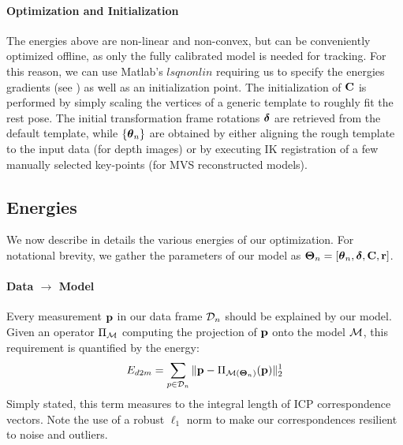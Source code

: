 \paragraph{Optimization and Initialization}
The energies above are non-linear and non-convex, but can be conveniently optimized offline, as only the fully calibrated model is needed for tracking. For this reason, we can use Matlab's $lsqnonlin$ requiring us to specify the energies gradients (see ) as well as an initialization point. The initialization of ${\mathbf{C}}$ is performed by simply scaling the vertices of a generic template to roughly fit the rest pose. The initial transformation frame rotations $\boldsymbol{\delta}$ are retrieved from the default template, while ${\{\boldsymbol{\theta}_n\}}$ are obtained by either aligning the rough template to the input data (for depth images) or by executing IK registration of a few manually selected key-points (for MVS reconstructed models).

\subsection{Energies}
We now describe in details the various energies of our optimization. For notational brevity, we gather the parameters of our model as $\boldsymbol{\Theta}_n=[\boldsymbol{\theta}_n, \boldsymbol{\delta}, {\mathbf{C}}, {\mathbf{r}}]$.

\paragraph{Data $\rightarrow$ Model}
Every measurement $\mathbf{p}$ in our data frame $\mathcal{D}_n$ should be explained by our model. Given an operator $\Pi_{\mathcal{M}}$ computing the projection of $\mathbf{p}$ onto the model $\mathcal{M}$, this requirement is quantified by the energy:
% 
\begin{equation}
E_{d2m} = \sum_{p \in \mathcal{D}_n} \| \mathbf{p} - \Pi_{\mathcal{M}(\boldsymbol{\Theta}_n)}(\mathbf{p})\|_2^1
\label{eq:d2m}
\end{equation}
% 
Simply stated, this term measures to the integral length of ICP correspondence vectors. Note the use of a robust $\ell_1$ norm to make our correspondences resilient to noise and outliers. 

